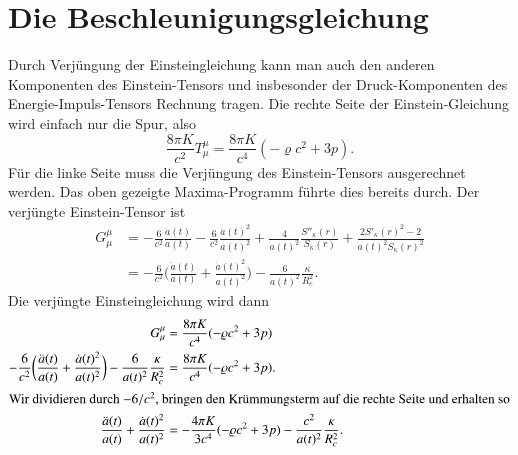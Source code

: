 \section{Die Beschleunigungsgleichung}
Durch Verjüngung der Einsteingleichung kann man auch den anderen
Komponenten des Einstein-Tensors und insbesonder der Druck-Komponenten 
des Energie-Impuls-Tensors Rechnung tragen.
Die rechte Seite der Einstein-Gleichung wird einfach nur die
Spur, also
\[
\frac{8\pi K}{c^2}
T^\mu_\mu = \frac{8\pi K}{c^4}(-\varrho c^2 + 3p).
\]
Für die linke Seite muss die Verjüngung des Einstein-Tensors ausgerechnet
werden.
Das oben gezeigte Maxima-Programm führte dies bereits durch.
Der verjüngte Einstein-Tensor ist
\begin{align*}
G^\mu_\mu
&=
- \frac{6}{c^2} \frac{\ddot a(t)}{a(t)}
-\frac{6}{c^2} \frac{\dot a(t)^2}{a(t)^2}
+\frac{4}{a(t)^2} \frac{S''_\kappa(r)}{S_\kappa(r)}
+\frac{2S'_\kappa(r)^2-2}{a(t)^2 S_\kappa(r)^2}
\\
&=
-\frac{6}{c^2}\biggl(\frac{\ddot a(t)}{a(t)} + \frac{\dot a(t)^2}{a(t)^2}\biggr)
-\frac{6}{a(t)^2}\frac{\kappa }{R_c^2}.
\end{align*}
Die verjüngte Einsteingleichung wird dann
\begin{align*}
G^\mu_\mu
&=
\frac{8\pi K}{c^4}(-\varrho  c^2+ 3p)
\\
-\frac{6}{c^2}\biggl(\frac{\ddot a(t)}{a(t)} + \frac{\dot a(t)^2}{a(t)^2}\biggr)
-\frac{6}{a(t)^2}\frac{\kappa }{R_c^2}
&=
\frac{8\pi K}{c^4}(-\varrho c^2 + 3p).
\\
\intertext{Wir dividieren durch $-6/c^2$, bringen den Krümmungsterm
auf die rechte Seite und erhalten so}
\frac{\ddot a(t)}{a(t)} + \frac{\dot a(t)^2}{a(t)^2}
&=
-\frac{4\pi K}{3c^4}(-\varrho c^2 + 3p)
-\frac{c^2}{a(t)^2}\frac{\kappa }{R_c^2}.
\end{align*}
